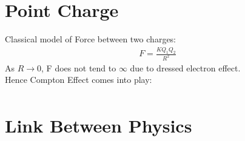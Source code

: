 \documentclass[12pt]{article}
\begin{document}
\section{Point Charge}
Classical model of Force between two charges:
\begin{align}
F=\frac{KQ_1Q_2}{R^2}
\end{align}
As $R \to 0$, F does not tend to $\infty$ due to dressed electron effect. \\
Hence Compton Effect comes into play:
\begin{align}
\end{align}
\section{Link Between Physics}
  \def\firstcircle{(90:1.75cm) circle (2.5cm)}
  \def\secondcircle{(210:1.75cm) circle (2.5cm)}
  \def\thirdcircle{(330:1.75cm) circle (2.5cm)}
\end{document}
